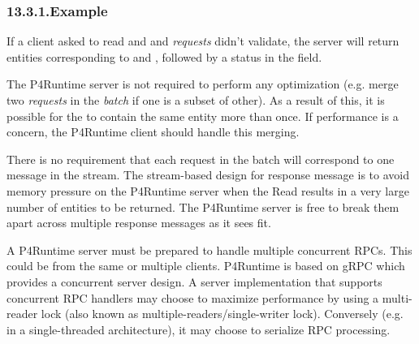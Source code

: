 \documentclass[11pt]{article}
\begin{document}
{%
\subsubsection{13.3.1.\hspace*{0.5em}Example}\label{sec-example}%

\noindent{}If a client asked to read  and  and  \emph{requests} didn't
validate, the server will return entities corresponding to  and , followed by
a status  in the
 field.%

The P4Runtime server is not required to perform any optimization (e.g. merge two
\emph{requests} in the \emph{batch} if one is a subset of other). As a result of this, it
is possible for the  to contain the same entity more than once. If
performance is a concern, the P4Runtime client should handle this merging.%

There is no requirement that each request in the batch will correspond to one
 message in the stream. The stream-based design for response
message is to avoid memory pressure on the P4Runtime server when the Read
results in a very large number of entities to be returned. The P4Runtime server
is free to break them apart across multiple response messages as it sees fit.%

A P4Runtime server must be prepared to handle multiple concurrent  RPCs.
This could be from the same or multiple clients. P4Runtime is based on gRPC
which provides a concurrent server design. A server implementation that supports
concurrent RPC handlers may choose to maximize performance by using a
multi-reader lock (also known as multiple-readers/single-writer lock).
Conversely (e.g. in a single-threaded architecture), it may choose to serialize
 RPC processing.%

}
\end{document}
